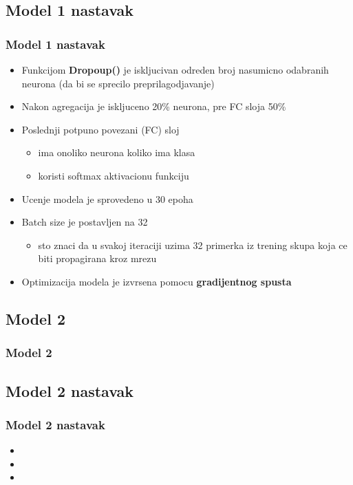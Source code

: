 \documentclass{beamer}
\begin{document}
\subsection{Model 1 nastavak}
\begin{frame}
\frametitle{Model 1 nastavak}

\begin{itemize}

\item Funkcijom \textbf{Dropoup()} je iskljucivan odreden broj nasumicno odabranih neurona (da bi se sprecilo preprilagodjavanje)
\item Nakon agregacija je iskljuceno 20\% neurona, pre FC sloja 50\%

\item Poslednji potpuno povezani (FC) sloj
\begin{itemize}
\item ima onoliko neurona koliko ima klasa
\item koristi softmax aktivacionu funkciju
\end{itemize}

\item Ucenje modela je sprovedeno u 30 epoha
\item Batch size je postavljen na 32
\begin{itemize}
\item sto znaci da u svakoj iteraciji uzima 32 primerka iz trening skupa koja ce biti propagirana kroz mrezu
\end{itemize}

\item Optimizacija modela je izvrsena pomocu \textbf{gradijentnog spusta}

\end{itemize}

\end{frame}


\subsection{Model 2}
\begin{frame}
\frametitle{Model 2}


\end{frame}



\subsection{Model 2 nastavak}
\begin{frame}
\frametitle{Model 2 nastavak}

\begin{itemize}
\item
\item
\item
\end{itemize}

\end{frame}
\end{document}
